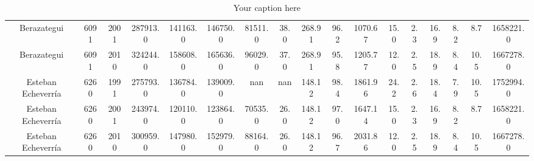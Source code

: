 \begin{table}[htb]
\begin{tabular}{|c|c|c|c|c|c|c|c|c|c|c|c|c|c|c|c|c|}
Berazategui & 6091 & 2001 & 287913.0 & 141163.0 & 146750.0 & 81511.0 & 38.0 & 268.91 & 96.2 & 1070.67 & 15.0 & 2.3 & 16.9 & 8.2 & 8.7 & 1658221.0 \\
Berazategui & 6091 & 2010 & 324244.0 & 158608.0 & 165636.0 & 96029.0 & 37.0 & 268.91 & 95.8 & 1205.77 & 12.0 & 2.5 & 18.9 & 8.4 & 10.5 & 1667278.0 \\
Esteban Echeverría & 6260 & 1991 & 275793.0 & 136784.0 & 139009.0 & nan & nan & 148.12 & 98.4 & 1861.96 & 24.2 & 2.6 & 18.4 & 7.9 & 10.5 & 1752994.0 \\
Esteban Echeverría & 6260 & 2001 & 243974.0 & 120110.0 & 123864.0 & 70535.0 & 26.0 & 148.12 & 97.0 & 1647.14 & 15.0 & 2.3 & 16.9 & 8.2 & 8.7 & 1658221.0 \\
Esteban Echeverría & 6260 & 2010 & 300959.0 & 147980.0 & 152979.0 & 88164.0 & 26.0 & 148.12 & 96.7 & 2031.86 & 12.0 & 2.5 & 18.9 & 8.4 & 10.5 & 1667278.0 \\
\hline
\end{tabular}
\caption{Your caption here}
\label{tab:my_table}
\end{table}
